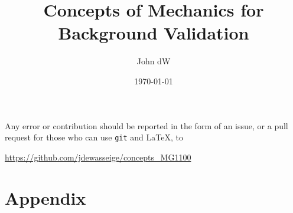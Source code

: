\documentclass[12pt,oneside,a4paper]{article}
\title{Concepts of Mechanics for Background Validation}
\author{John dW}
\date{\today}
\begin{document}
\maketitle

Any error or contribution should be reported
in the form of an issue, or a pull request for those
who can use \texttt{git} and \LaTeX, to
\begin{center}
  \url{https://github.com/jdewasseige/concepts_MG1100}
\end{center}


\newpage

\newpage

\newpage


\part*{Appendix}
\appendix


\end{document}
